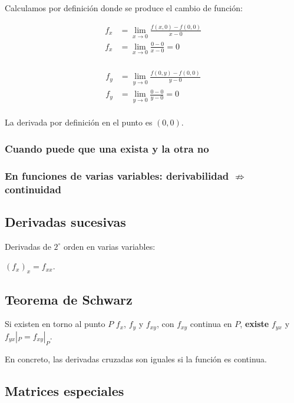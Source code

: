 Calculamos por definición donde se produce el cambio de función:

\begin{align*}
     f_x & = \lim_{x \to 0}\frac{f(x,0) - f(0,0)}{x - 0} \\
     f_x & = \lim_{x \to 0}\frac{0 - 0}{x - 0} = \boxed{0} \\
\end{align*}

\begin{align*}
     f_y & = \lim_{y \to 0}\frac{f(0,y) - f(0,0)}{y - 0} \\
     f_y & = \lim_{y \to 0}\frac{0 - 0}{y - 0} = \boxed{0} \\
\end{align*}

La derivada por definición en el punto es \((0,0)\).

\subsubsection{Cuando puede que una exista y la otra no}

\subsubsection{En funciones de varias variables: derivabilidad \(\nRightarrow\) continuidad}

\subsection{Derivadas sucesivas}

Derivadas de \(2^{\circ}\) orden en varias variables:

\((f_x)_x = f_{xx}\).

\subsection{Teorema de Schwarz}

Si existen en torno al punto \(P\) \(f_x\),
\(f_y\)
y \(f_{xy}\),
con \(f_{xy}\) continua en \(P\),
\textbf{existe} \(f_{yx}\) y \(f_{yx}|_P = f_{xy}|_P\).

En concreto,
las derivadas cruzadas son iguales si la función es continua.

\subsection{Matrices especiales}

